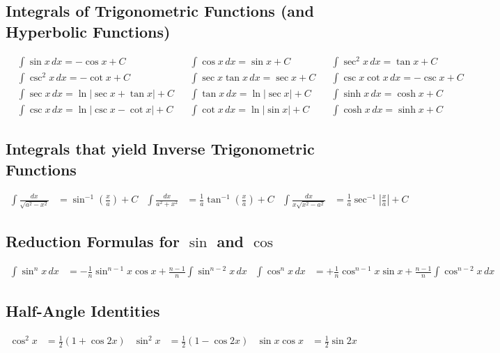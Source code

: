 \subsection{Integrals of Trigonometric Functions (and Hyperbolic Functions)}
\begin{align*}
    &\int \sin x \, dx = -\cos x + C &&
    \int \cos x \, dx = \sin x + C &&
    \int \sec^2 x \, dx = \tan x + C \\
    &\int \csc^2 x \, dx = -\cot x + C &&
    \int \sec x \tan x \, dx = \sec x + C &&
    \int \csc x \cot x \, dx = -\csc x + C \\
    &\int \sec x \, dx = \ln |\sec x + \tan x | + C &&
    \int \tan x \, dx = \ln |\sec x | + C  &&
    \int \sinh x \, dx = \cosh x + C \\
    &\int \csc x \, dx = \ln |\csc x - \cot x | + C &&
    \int \cot x \, dx = \ln |\sin x | + C &&
    \int \cosh x \, dx = \sinh x + C
\end{align*}

\subsection{Integrals that yield Inverse Trigonometric Functions}
\begin{align*}
    \int \frac{dx}{\sqrt{a^2-x^2}} &= \sin^{-1} \left( \frac{x}{a} \right) + C & 
    \int \frac{dx}{a^2+x^2} &= \frac{1}{a} \tan^{-1} \left( \frac{x}{a} \right) + C &
    \int \frac{dx}{x \sqrt{x^2-a^2}} &= \frac{1}{a} \sec^{-1} \left| \frac{x}{a} \right| + C
\end{align*}

\subsection{Reduction Formulas for $\sin$ and $\cos$}
\begin{align*}
    \int \sin^n x \, dx &= -\frac{1}{n} \sin^{n-1} x \cos x + \frac{n-1}{n} \int \sin^{n-2} x \, dx &
    \int \cos^n x \, dx &= +\frac{1}{n} \cos^{n-1} x \sin x + \frac{n-1}{n} \int \cos^{n-2} x \, dx
\end{align*}

\subsection{Half-Angle Identities}
\begin{align*}
    \cos^2 x &= \frac{1}{2} (1 + \cos 2x) &
    \sin^2 x &= \frac{1}{2} (1 - \cos 2x) &
    \sin x \cos x &= \frac{1}{2} \sin 2x
\end{align*}

